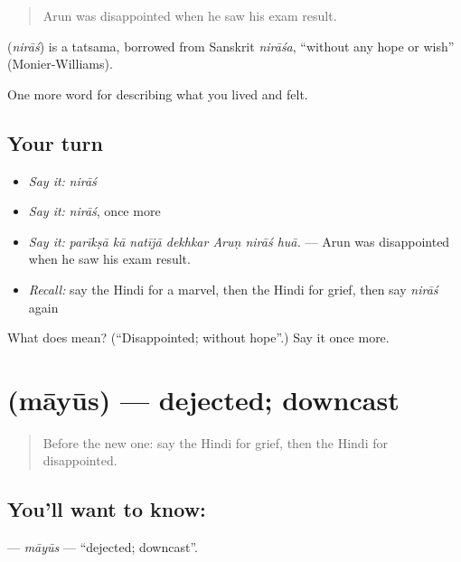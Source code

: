 \begin{quote}
Arun was disappointed when he saw his exam result.
\end{quote}

\begin{cousinweb}
\textbf{} (\emph{nirāś}) is a tatsama, borrowed from Sanskrit \emph{nirāśa}, \textquotedblleft{}without any hope or wish\textquotedblright{} (Monier-Williams).
\end{cousinweb}

\begin{grammarlens}[title={What you've built}]
One more word for describing what you lived and felt.
\end{grammarlens}

\subsection*{Your turn}
\begin{itemize}
\raggedright
  \item \emph{Say it:} \emph{nirāś}
  \item \emph{Say it:} \emph{nirāś}, once more
  \item \emph{Say it:} \emph{parīkṣā kā natījā dekhkar Aruṇ nirāś huā.} — Arun was disappointed when he saw his exam result.
  \item \emph{Recall:} say the Hindi for a marvel, then the Hindi for grief, then say \emph{nirāś} again
\end{itemize}

\begin{tcolorbox}[breakable,colback=teal!4,colframe=teal!35!black,title={Before you move on}]
What does  mean? (\textquotedblleft{}Disappointed; without hope\textquotedblright{}.) Say it once more.
\end{tcolorbox}
\section[\texorpdfstring{\hi{मायूस} (māyūs)}{मायूस (māyūs)}]{ (māyūs) — dejected; downcast}

\label{lesson:HI-C455-mayus}



\begin{quote}
Before the new one: say the Hindi for grief, then the Hindi for disappointed.
\end{quote}

\subsection*{You'll want to know: }
\textbf{} — \emph{māyūs} — \textquotedblleft{}dejected; downcast\textquotedblright{}.

